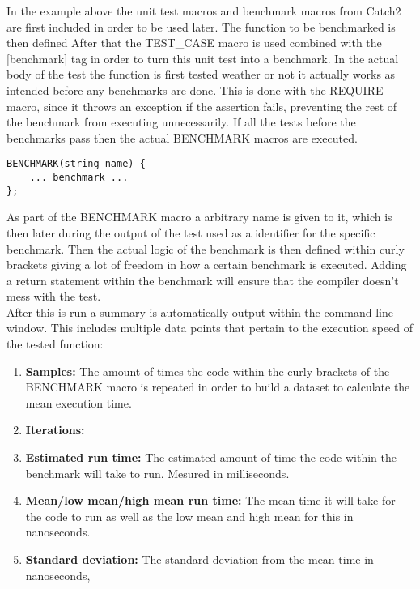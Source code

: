In the example above the unit test macros and benchmark macros from Catch2 are first included in order to be used later. The function to be benchmarked is then defined
After that the TEST\_CASE macro is used combined with the [\!benchmark] tag in order to turn this unit test into a benchmark. In the actual body of the test the function
is first tested weather or not it actually works as intended before any benchmarks are done. This is done with the REQUIRE macro, since it throws an exception if the 
assertion fails, preventing the rest of the benchmark from executing unnecessarily. If all the tests before the benchmarks pass then the actual BENCHMARK macros are
executed.

\begin{verbatim}
BENCHMARK(string name) {
    ... benchmark ...
};
\end{verbatim}

As part of the BENCHMARK macro a arbitrary name is given to it, which is then later during the output of the test used as a identifier for the specific benchmark.
Then the actual logic of the benchmark is then defined within curly brackets giving a lot of freedom in how a certain benchmark is executed. Adding a return statement
within the benchmark will ensure that the compiler doesn't mess with the test.\\
\vspace{\baselineskip}
After this is run a summary is automatically output within the command line window. This includes multiple data points that pertain to the execution speed of the tested
function:
\begin{enumerate}
    \item \textbf{Samples:} The amount of times the code within the curly brackets of the BENCHMARK macro is repeated in order to build a dataset to calculate the mean execution time.
    \item \textbf{Iterations:} %
    \item \textbf{Estimated run time:} The estimated amount of time the code within the benchmark will take to run. Mesured in milliseconds.
    \item \textbf{Mean/low mean/high mean run time:} The mean time it will take for the code to run as well as the low mean and high mean for this in nanoseconds.
    \item \textbf{Standard deviation:} The standard deviation from the mean time in nanoseconds,
\end{enumerate}

